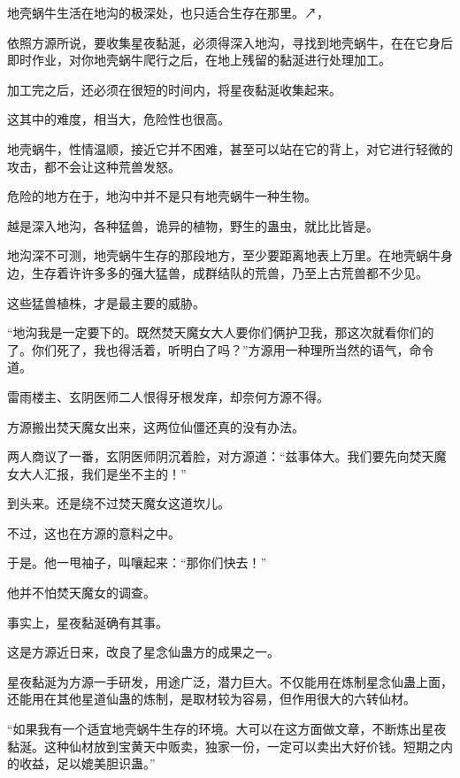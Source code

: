 
\begin{this_body}

地壳蜗牛生活在地沟的极深处，也只适合生存在那里。↗，

依照方源所说，要收集星夜黏涎，必须得深入地沟，寻找到地壳蜗牛，在在它身后即时作业，对你地壳蜗牛爬行之后，在地上残留的黏涎进行处理加工。

加工完之后，还必须在很短的时间内，将星夜黏涎收集起来。

这其中的难度，相当大，危险性也很高。

地壳蜗牛，性情温顺，接近它并不困难，甚至可以站在它的背上，对它进行轻微的攻击，都不会让这种荒兽发怒。

危险的地方在于，地沟中并不是只有地壳蜗牛一种生物。

越是深入地沟，各种猛兽，诡异的植物，野生的蛊虫，就比比皆是。

地沟深不可测，地壳蜗牛生存的那段地方，至少要距离地表上万里。在地壳蜗牛身边，生存着许许多多的强大猛兽，成群结队的荒兽，乃至上古荒兽都不少见。

这些猛兽植株，才是最主要的威胁。

“地沟我是一定要下的。既然焚天魔女大人要你们俩护卫我，那这次就看你们的了。你们死了，我也得活着，听明白了吗？”方源用一种理所当然的语气，命令道。

雷雨楼主、玄阴医师二人恨得牙根发痒，却奈何方源不得。

方源搬出焚天魔女出来，这两位仙僵还真的没有办法。

两人商议了一番，玄阴医师阴沉着脸，对方源道：“兹事体大。我们要先向焚天魔女大人汇报，我们是坐不主的！”

到头来。还是绕不过焚天魔女这道坎儿。

不过，这也在方源的意料之中。

于是。他一甩袖子，叫嚷起来：“那你们快去！”

他并不怕焚天魔女的调查。

事实上，星夜黏涎确有其事。

这是方源近日来，改良了星念仙蛊方的成果之一。

星夜黏涎为方源一手研发，用途广泛，潜力巨大。不仅能用在炼制星念仙蛊上面，还能用在其他星道仙蛊的炼制，是取材较为容易，但作用很大的六转仙材。

“如果我有一个适宜地壳蜗牛生存的环境。大可以在这方面做文章，不断炼出星夜黏涎。这种仙材放到宝黄天中贩卖，独家一份，一定可以卖出大好价钱。短期之内的收益，足以媲美胆识蛊。”


\end{this_body}

